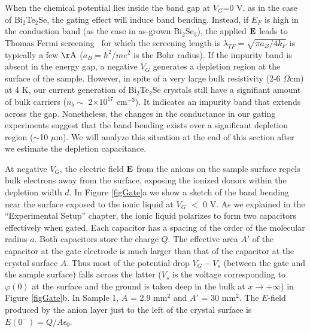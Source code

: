 
When the chemical potential lies inside the band gap at $V_G$=0 V, as in the case of Bi$_2$Te$_2$Se, the gating effect will induce band bending. Instead, if $E_F$ is high in the conduction band (as the case in as-grown Bi$_2$Se$_3$), the applied $\bf E$
leads to Thomas Fermi screening~\cite{Ashcroft} for which the screening length is
$\lambda_{TF} = \sqrt{\pi a_B/4k_F}$ is typically a few $\rm \AA$ ($a_B = \hbar^2/me^2$ is the Bohr radius).
If the impurity band is absent in the energy gap, a negative $V_G$ generates a depletion region at the surface of the sample.
However, in spite of a very large
bulk resistivity (2-6 $\Omega$cm) at 4 K, our current generation of Bi$_2$Te$_2$Se crystals still have a signifiant amount of bulk carriers ($n_b\sim$ 2$\times 10^{17}$ cm$^{-3}$). It indicates an impurity band that extends across the gap.
Nonetheless, the changes in the conductance in our gating experiments suggest that the band bending exists over a significant depletion region ($\sim$10 $\mu$m).
We will analyze this situation at the end of this section after we estimate the depletion capacitance.


At negative $V_G $, the electric field $\bf E$ from the anions on the sample surface repels bulk electrons away from the surface,
exposing the ionized donors within the depletion width $d$. 
In Figure \ref{figGate}a we show a sketch of the band bending near the surface exposed to the ionic liquid at $V_G$ $< $ 0 V.
As we explained in the ``Experimental Setup'' chapter, the ionic liquid polarizes to form two capacitors effectively when gated. Each capacitor has a spacing of the order of the molecular radius $a$. Both capacitors store the charge $Q$. 
The effective area $A'$ of the capacitor at the gate electrode is much larger than that of the capacitor at the crystal surface $A$. Thus most of the potential drop $V_G-V_s$ (between the gate and the sample surface) falls across the latter ($V_s$ is the voltage 
corresponding to $\varphi(0)$ at the surface and the ground is taken deep in the bulk at $x\to +\infty$) in Figure \ref{figGate}b.
In Sample 1, $A$ = 2.9 mm$^2$ and $A'$ = 30 mm$^2$. 
The $E$-field produced by the anion layer just to the left of the crystal surface is 
$E(0^-) = Q/A\epsilon_0$.


